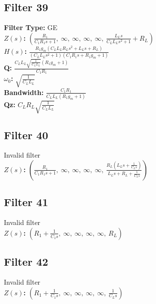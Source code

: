 \documentclass{article}
\begin{document}
\subsection*{Filter 39}
\textbf{Filter Type:} GE \\ 
\textbf{$Z(s)$:} $\left( \frac{R_{1}}{C_{1} R_{1} s + 1}, \  \infty, \  \infty, \  \infty, \  \infty, \  \frac{L_{L} s}{C_{L} L_{L} s^{2} + 1} + R_{L}\right)$ \\ 
\textbf{$H(s)$:} $\frac{R_{1} g_{m} \left(C_{L} L_{L} R_{L} s^{2} + L_{L} s + R_{L}\right)}{\left(C_{L} L_{L} s^{2} + 1\right) \left(C_{1} R_{1} s + R_{1} g_{m} + 1\right)}$ \\ 
\textbf{Q:} $\frac{C_{L} L_{L} \sqrt{\frac{1}{C_{L} L_{L}}} \left(R_{1} g_{m} + 1\right)}{C_{1} R_{1}}$ \\ 
\textbf{$\omega_0$:} $\sqrt{\frac{1}{C_{L} L_{L}}}$ \\ 
\textbf{Bandwidth:} $\frac{C_{1} R_{1}}{C_{L} L_{L} \left(R_{1} g_{m} + 1\right)}$ \\ 
\textbf{Qz:} $C_{L} R_{L} \sqrt{\frac{1}{C_{L} L_{L}}}$ \\ 
\subsection*{Filter 40}
Invalid filter \\ 
\textbf{$Z(s)$:} $\left( \frac{R_{1}}{C_{1} R_{1} s + 1}, \  \infty, \  \infty, \  \infty, \  \infty, \  \frac{R_{L} \left(L_{L} s + \frac{1}{C_{L} s}\right)}{L_{L} s + R_{L} + \frac{1}{C_{L} s}}\right)$ \\ 
\subsection*{Filter 41}
Invalid filter \\ 
\textbf{$Z(s)$:} $\left( R_{1} + \frac{1}{C_{1} s}, \  \infty, \  \infty, \  \infty, \  \infty, \  R_{L}\right)$ \\ 
\subsection*{Filter 42}
Invalid filter \\ 
\textbf{$Z(s)$:} $\left( R_{1} + \frac{1}{C_{1} s}, \  \infty, \  \infty, \  \infty, \  \infty, \  \frac{1}{C_{L} s}\right)$ \\ 
\end{document}
